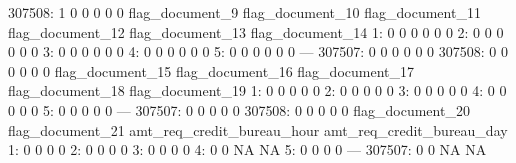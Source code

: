 \documentclass[a4paper]{article}
\begin{document}
\begin{Schunk}
\begin{Soutput}
307508:               1               0               0               0               0               0
        flag_document_9 flag_document_10 flag_document_11 flag_document_12 flag_document_13 flag_document_14
     1:               0                0                0                0                0                0
     2:               0                0                0                0                0                0
     3:               0                0                0                0                0                0
     4:               0                0                0                0                0                0
     5:               0                0                0                0                0                0
    ---                                                                                                     
307507:               0                0                0                0                0                0
307508:               0                0                0                0                0                0
        flag_document_15 flag_document_16 flag_document_17 flag_document_18 flag_document_19
     1:                0                0                0                0                0
     2:                0                0                0                0                0
     3:                0                0                0                0                0
     4:                0                0                0                0                0
     5:                0                0                0                0                0
    ---                                                                                     
307507:                0                0                0                0                0
307508:                0                0                0                0                0
        flag_document_20 flag_document_21 amt_req_credit_bureau_hour amt_req_credit_bureau_day
     1:                0                0                          0                         0
     2:                0                0                          0                         0
     3:                0                0                          0                         0
     4:                0                0                         NA                        NA
     5:                0                0                          0                         0
    ---                                                                                       
307507:                0                0                         NA                        NA

\end{Soutput}
\end{Schunk}
\end{document}
